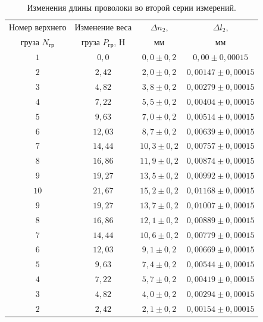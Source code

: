 \documentclass[a4paper,11pt]{article}
\begin{document}
\begin{table}[h!]
\centering
\begin{tabular}{ ||c|c|c|c|| }
  \hline
  Номер верхнего & Изменение веса & $\Delta n_{2}$, & $\Delta l_{2}$, \\
  груза $N_{гр}$ & груза $P_{гр}$, $Н$ & $мм$ & $мм$ \\
  \hline
  $1$ & $0,0$ & $0,0 \pm 0,2$ & $0,00 \pm 0,00015$ \\
  $2$ & $2,42$ & $2,0 \pm 0,2$ & $0,00147 \pm 0,00015$ \\
  $3$ & $4,82$ & $3,8 \pm 0,2$ & $0,00279 \pm 0,00015$ \\
  $4$ & $7,22$ & $5,5 \pm 0,2$ & $0,00404 \pm 0,00015$ \\
  $5$ & $9,63$ & $7,0 \pm 0,2$ & $0,00514 \pm 0,00015$ \\
  $6$ & $12,03$ & $8,7 \pm 0,2$ & $0,00639 \pm 0,00015$ \\
  $7$ & $14,44$ & $10,3 \pm 0,2$ & $0,00757 \pm 0,00015$ \\
  $8$ & $16,86$ & $11,9 \pm 0,2$ & $0,00874 \pm 0,00015$ \\
  $9$ & $19,27$ & $13,5 \pm 0,2$ & $0,00992 \pm 0,00015$ \\
  $10$ & $21,67$ & $15,2 \pm 0,2$ & $0,01168 \pm 0,00015$ \\
  $9$ & $19,27$ & $13,7 \pm 0,2$ & $0,01007 \pm 0,00015$ \\
  $8$ & $16,86$ & $12,1 \pm 0,2$ & $0,00889 \pm 0,00015$ \\
  $7$ & $14,44$ & $10,6 \pm 0,2$ & $0,00779 \pm 0,00015$ \\
  $6$ & $12,03$ & $9,1 \pm 0,2$ & $0,00669 \pm 0,00015$ \\
  $5$ & $9,63$ & $7,4 \pm 0,2$ & $0,00544 \pm 0,00015$ \\
  $4$ & $7,22$ & $5,7 \pm 0,2$ & $0,00419 \pm 0,00015$ \\
  $3$ & $4,82$ & $4,0 \pm 0,2$ & $0,00294 \pm 0,00015$ \\
  $2$ & $2,42$ & $2,1 \pm 0,2$ & $0,00154 \pm 0,00015$ \\
  \hline
\end{tabular}
\caption{Изменения длины проволоки во второй серии измерений.}
\label{table:tab3}
\end{table}
\end{document}

